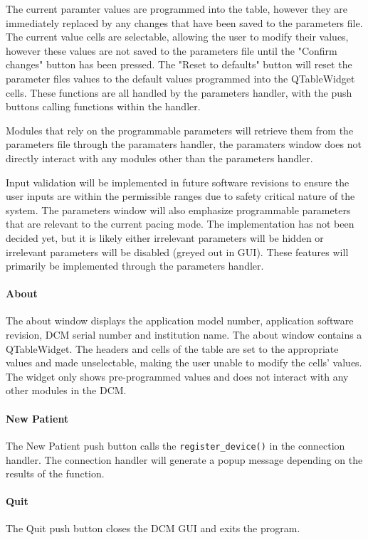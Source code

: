 \documentclass[12pt]{article}
\begin{document}
The current paramter values are programmed into the table, however they are immediately replaced by any changes that have been saved to the parameters file. The current value cells are selectable, allowing the user to modify their values, however these values are not saved to the parameters file until the "Confirm changes" button has been pressed. The "Reset to defaults" button will reset the parameter files values to the default values programmed into the QTableWidget cells. These functions are all handled by the parameters handler, with the push buttons calling functions within the handler.

Modules that rely on the programmable parameters will retrieve them from the parameters file through the paramaters handler, the paramaters window does not directly interact with any modules other than the parameters handler.

Input validation will be implemented in future software revisions to ensure the user inputs are within the permissible ranges due to safety critical nature of the system. The parameters window will also emphasize programmable parameters that are relevant to the current pacing mode. The implementation has not been decided yet, but it is likely either irrelevant parameters will be hidden or irrelevant parameters will be disabled (greyed out in GUI). These features will primarily be implemented through the parameters handler.   

\paragraph{About}
The about window displays the application model number, application software revision, DCM serial number and institution name. The about window contains a QTableWidget. The headers and cells of the table are set to the appropriate values and made unselectable, making the user unable to modify the cells' values. The widget only shows pre-programmed values and does not interact with any other modules in the DCM.

\paragraph{New Patient}
The New Patient push button calls the \verb|register_device()| in the connection handler. The connection handler will generate a popup message depending on the results of the function.

\paragraph{Quit}
The Quit push button closes the DCM GUI and exits the program.
\end{document}
